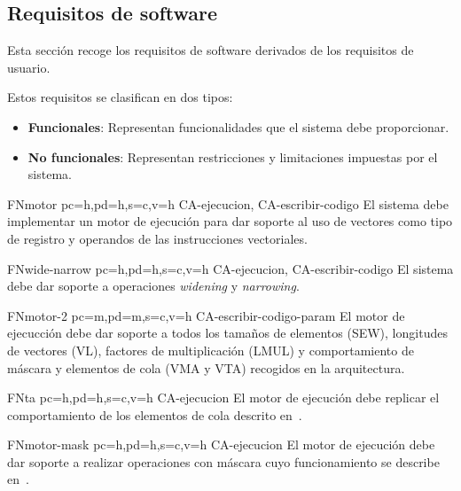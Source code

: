 \subsection{Requisitos de software}

Esta sección recoge los requisitos de software derivados de los requisitos de usuario.

Estos requisitos se clasifican en dos tipos:
\begin{itemize}
    \item \textbf{Funcionales}: Representan funcionalidades que el sistema debe proporcionar.
    \item \textbf{No funcionales}: Representan restricciones y limitaciones impuestas por el sistema.
\end{itemize}

\printsreqtemplate{}

\begin{softwareReq}{FN}{motor}
    {pc=h,pd=h,s=c,v=h}
    {CA-ejecucion, CA-escribir-codigo}
    El sistema debe implementar un motor de ejecución para dar soporte al uso de vectores como tipo de registro y operandos de las instrucciones vectoriales.
\end{softwareReq}

\begin{softwareReq}{FN}{wide-narrow}
    {pc=h,pd=h,s=c,v=h}
    {CA-ejecucion, CA-escribir-codigo}
    El sistema debe dar soporte a operaciones \textit{widening} y \textit{narrowing}.
\end{softwareReq}

\begin{softwareReq}{FN}{motor-2}
    {pc=m,pd=m,s=c,v=h}
    {CA-escribir-codigo-param}
    El motor de ejecucción debe dar soporte a todos los tamaños de elementos (SEW), longitudes de vectores (VL), factores de multiplicación (LMUL) y comportamiento de máscara y elementos de cola (VMA y VTA) recogidos en la arquitectura.
\end{softwareReq}

\begin{softwareReq}{FN}{ta}
    {pc=h,pd=h,s=c,v=h}
    {CA-ejecucion}
    El motor de ejecución debe replicar el comportamiento de los elementos de cola descrito en~\cite{riscv-isa2024}.
\end{softwareReq}

\begin{softwareReq}{FN}{motor-mask}
    {pc=h,pd=h,s=c,v=h}
    {CA-ejecucion}
    El motor de ejecución debe dar soporte a realizar operaciones con máscara cuyo funcionamiento se describe en~\cite{riscv-isa2024}.
\end{softwareReq}

